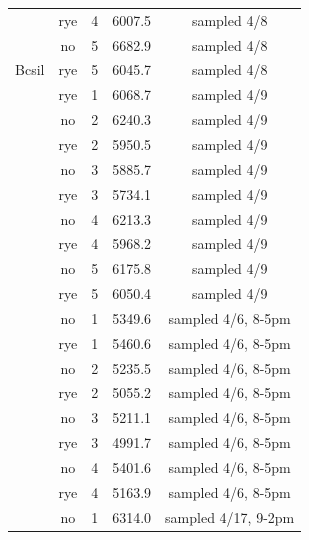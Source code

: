 \documentclass[]{article}
\begin{document}
\begin{table}[H]
\begin{tabular}[t]{ccccc}
 & rye & 4 & 6007.5 & sampled 4/8\\

\rowcolor{gray!6}   & no & 5 & 6682.9 & sampled 4/8\\

\multirow[t]{-10}{*}{\centering\arraybackslash Bcsil} & rye & 5 & 6045.7 & sampled 4/8\\
\cmidrule{1-5}
\rowcolor{gray!6}   & rye & 1 & 6068.7 & sampled 4/9\\

 & no & 2 & 6240.3 & sampled 4/9\\

\rowcolor{gray!6}   & rye & 2 & 5950.5 & sampled 4/9\\

 & no & 3 & 5885.7 & sampled 4/9\\

\rowcolor{gray!6}   & rye & 3 & 5734.1 & sampled 4/9\\

 & no & 4 & 6213.3 & sampled 4/9\\

\rowcolor{gray!6}   & rye & 4 & 5968.2 & sampled 4/9\\

 & no & 5 & 6175.8 & sampled 4/9\\

\rowcolor{gray!6}  \multirow[t]{-9}{*}{\centering\arraybackslash BS} & rye & 5 & 6050.4 & sampled 4/9\\
\cmidrule{1-5}
 & no & 1 & 5349.6 & sampled 4/6, 8-5pm\\

\rowcolor{gray!6}   & rye & 1 & 5460.6 & sampled 4/6, 8-5pm\\

 & no & 2 & 5235.5 & sampled 4/6, 8-5pm\\

\rowcolor{gray!6}   & rye & 2 & 5055.2 & sampled 4/6, 8-5pm\\

 & no & 3 & 5211.1 & sampled 4/6, 8-5pm\\

\rowcolor{gray!6}   & rye & 3 & 4991.7 & sampled 4/6, 8-5pm\\

 & no & 4 & 5401.6 & sampled 4/6, 8-5pm\\

\rowcolor{gray!6}  \multirow[t]{-8}{*}{\centering\arraybackslash East} & rye & 4 & 5163.9 & sampled 4/6, 8-5pm\\
\cmidrule{1-5}
 & no & 1 & 6314.0 & sampled 4/17, 9-2pm\\


\end{tabular}
\end{table}
\end{document}

